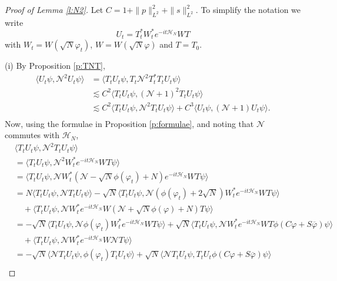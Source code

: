 \documentclass[11pt,a4paper]{scrartcl}
\newcommand{\N}{\mathcal{N}}
\begin{document}
\begin{proof}[Proof of Lemma \ref{l:N2}]
  Let $C = 1 + \| p \|_{L^2}^2 + \| s \|_{L^2}^2$. To simplify the notation we
  write
  \[
    U_t = T_t^* W_t^* e^{-it \mathcal{H}_N} WT
  \]
  with $W_t = W(\sqrt{N} \varphi_t)$, $W = W(\sqrt{N} \varphi)$ and $T = T_0$.


  (i) By Proposition \ref{p:TNT},
  \begin{equation}
    \label{ep4}
    \begin{split}
      \langle U_t \psi, \N^2 U_t \psi \rangle & = \langle T_t U_t \psi, T_t
      \N^2 T_t^* T_t U_t \psi \rangle \\
      & \apprle C^2 \langle T_t U_t \psi, (\N+1)^2 T_t U_t \psi \rangle \\
      & \apprle C^2 \langle T_t U_t \psi, \N^2 T_t U_t \psi \rangle + C^3
      \langle U_t \psi, (\N+1) U_t \psi \rangle. \\
    \end{split}
  \end{equation} 
  Now, using the formulae in Proposition \ref{p:formulae}, and noting that
  $\N$ commutes with $\mathcal{H}_N$,
  \begin{align*}
    & \langle T_t U_t \psi, \N^2 T_t U_t \psi \rangle \\
    & = \langle T_t U_t \psi, \N^2 W_t^* e^{-it \mathcal{H}_N} WT \psi \rangle
    \\
    & = \langle T_t U_t \psi, \N W_t^* (\N - \sqrt{N} \phi(\varphi_t) + N)
    e^{-it \mathcal{H}_N} WT \psi \rangle \\
    & = N \langle T_t U_t \psi, \N T_t U_t \psi \rangle - \sqrt{N} \langle T_t
    U_t \psi, \N ( \phi(\varphi_t) + 2\sqrt{N}) W_t^* e^{-it\mathcal{H}_N} WT
    \psi \rangle \\
    & \quad + \langle T_t U_t \psi, \N W_t^* e^{-it\mathcal{H}_N} W(\N +
    \sqrt{N} \phi(\varphi) + N) T \psi \rangle \\
    & = - \sqrt{N} \langle T_t U_t \psi, \N \phi(\varphi_t) W_t^*
    e^{-it\mathcal{H}_N} WT \psi \rangle + \sqrt{N} \langle T_t U_t \psi, \N
    W_t^* e^{-it\mathcal{H}_N} W T \phi(C \varphi + S \overline{\varphi}) \psi
    \rangle \\
    & \quad + \langle T_t U_t \psi, \N W_t^* e^{-it\mathcal{H}_N} W \N T \psi
    \rangle \\
    & = - \sqrt{N} \langle \N T_t U_t \psi, \phi(\varphi_t) T_t U_t \psi
    \rangle + \sqrt{N} \langle \N T_t U_t \psi, T_t U_t \phi(C \varphi + S
    \overline{\varphi}) \psi \rangle \\

\end{align*}
\end{proof}
\end{document}
